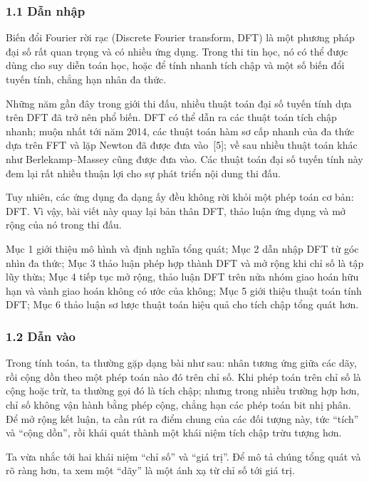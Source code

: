 \documentclass[11pt]{article}
\begin{document}
\subsubsection*{1.1 Dẫn nhập}

Biến đổi Fourier rời rạc (Discrete Fourier transform, DFT) là một phương pháp
đại số rất quan trọng và có nhiều ứng dụng. Trong thi tin học, nó có thể được
dùng cho suy diễn toán học, hoặc để tính nhanh tích chập và một số biến đổi
tuyến tính, chẳng hạn nhân đa thức.

Những năm gần đây trong giới thi đấu, nhiều thuật toán đại số tuyến tính dựa
trên DFT đã trở nên phổ biến. DFT có thể dẫn ra các thuật toán tích chập nhanh;
muộn nhất tới năm 2014, các thuật toán hàm sơ cấp nhanh của đa thức dựa trên
FFT và lặp Newton đã được đưa vào~[5]; về sau nhiều thuật toán khác như
Berlekamp--Massey cũng được đưa vào. Các thuật toán đại số tuyến tính này đem
lại rất nhiều thuận lợi cho sự phát triển nội dung thi đấu.

Tuy nhiên, các ứng dụng đa dạng ấy đều không rời khỏi một phép toán cơ bản:
DFT. Vì vậy, bài viết này quay lại bản thân DFT, thảo luận ứng dụng và mở rộng
của nó trong thi đấu.

Mục 1 giới thiệu mô hình và định nghĩa tổng quát; Mục 2 dẫn nhập DFT từ góc
nhìn đa thức; Mục 3 thảo luận phép hợp thành DFT và mở rộng khi chỉ số là tập
lũy thừa; Mục 4 tiếp tục mở rộng, thảo luận DFT trên nửa nhóm giao hoán hữu hạn
và vành giao hoán không có ước của không; Mục 5 giới thiệu thuật toán tính DFT;
Mục 6 thảo luận sơ lược thuật toán hiệu quả cho tích chập tổng quát hơn.

\subsubsection*{1.2 Dẫn vào}

Trong tính toán, ta thường gặp dạng bài như sau: nhân tương ứng giữa các dãy,
rồi cộng dồn theo một phép toán nào đó trên chỉ số. Khi phép toán trên chỉ số là
cộng hoặc trừ, ta thường gọi đó là tích chập; nhưng trong nhiều trường hợp hơn,
chỉ số không vận hành bằng phép cộng, chẳng hạn các phép toán bit nhị phân. Để
mở rộng kết luận, ta cần rút ra điểm chung của các đối tượng này, tức ``tích''
và ``cộng dồn'', rồi khái quát thành một khái niệm tích chập trừu tượng hơn.

Ta vừa nhắc tới hai khái niệm ``chỉ số'' và ``giá trị''. Để mô tả chúng tổng
quát và rõ ràng hơn, ta xem một ``dãy'' là một ánh xạ từ chỉ số tới giá trị.
\end{document}
